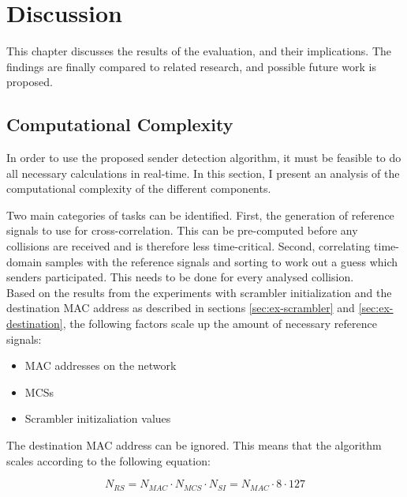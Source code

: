 
\chapter{Discussion}\label{ch:Discussion}
\glsresetall %

This chapter discusses the results of the evaluation, and their implications. The findings are finally compared to related research, and possible future work is proposed.



\section{Computational Complexity}

In order to use the proposed sender detection algorithm, it must be feasible to do all necessary calculations in real-time. In this section, I present an analysis of the computational complexity of the different components.

Two main categories of tasks can be identified. First, the generation of reference signals to use for cross-correlation. This can be pre-computed before any collisions are received and is therefore less time-critical. Second, correlating time-domain samples with the reference signals and sorting to work out a guess which senders participated. This needs to be done for every analysed collision.\\

Based on the results from the experiments with scrambler initialization and the destination MAC address as described in sections \ref{sec:ex-scrambler} and \ref{sec:ex-destination}, the following factors scale up the amount of necessary reference signals:

\begin{itemize}
  \item MAC addresses on the network
  \item \glspl{MCS}
  \item Scrambler initizaliation values
\end{itemize}

The destination MAC address can be ignored. This means that the algorithm scales according to the following equation:

$$ N_{RS} = N_{MAC} \cdot N_{MCS} \cdot N_{SI} = N_{MAC} \cdot 8 \cdot 127 $$\vspace{0cm}

